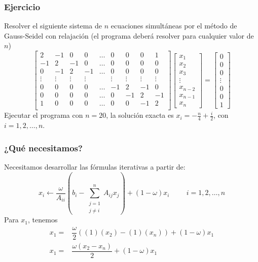 \begin{frame}
\frametitle{Ejercicio}
\fontsize{10}{10}\selectfont
Resolver el siguiente sistema de $n$ ecuaciones simultáneas por el método de Gauss-Seidel con relajación (el programa deberá resolver para cualquier valor de $n$)
\[ \begin{bmatrix}
2 & -1 & 0 & 0 & \ldots & 0 & 0 & 0 & 1 \\
-1 & 2 & -1 & 0 & \ldots & 0 & 0 & 0 & 0 \\
0 & -1 & 2 & -1 & \ldots & 0 & 0 & 0 & 0 \\
\vdots & \vdots & \vdots & \vdots & & \vdots & \vdots & \vdots & \vdots \\
0 & 0 & 0 & 0 & \ldots & -1 & 2 & -1 & 0 \\
0 & 0 & 0 & 0 & \ldots & 0 & -1 & 2 & -1 \\
1 & 0 & 0 & 0 & \ldots & 0 & 0 & -1 & 2 \\
\end{bmatrix}
\begin{bmatrix}
x_{1} \\
x_{2} \\
x_{3} \\
\vdots \\
x_{n-2} \\
x_{n-1} \\
x_{n} 
\end{bmatrix} = 
\begin{bmatrix}
0 \\
0 \\
0 \\
\vdots \\
0 \\
0 \\
1 
\end{bmatrix} \]
Ejecutar el programa con $n=20$, la solución exacta es $x_{i}= - \frac{n}{4} + \frac{i}{2}$, con $i=1,2,\ldots,n$.
\end{frame}
\begin{frame}
\frametitle{¿Qué necesitamos?}
Necesitamos desarrollar las fórmulas iterativas a partir de:
\[  x_{i}\leftarrow \dfrac{\omega}{A_{ii}} \left( b_{i} - \sum_{\substack{ j=1 \\ j \neq i}}^{n} A_{ij} x_{j} \right) + (1 - \omega) x_{i} \hspace{1cm} i=1,2,\ldots,n \]
Para $x_{1}$, tenemos
\[ \begin{split}
x_{1} =& \dfrac{\omega}{2} \left( (1)(x_{2})-(1)(x_{n}) \right) + (1-\omega)x_{1} \\
x_{1} =& \dfrac{\omega(x_{2}-x_{n})}{2} + (1 - \omega)x_{1}
\end{split} \]
\end{frame}
